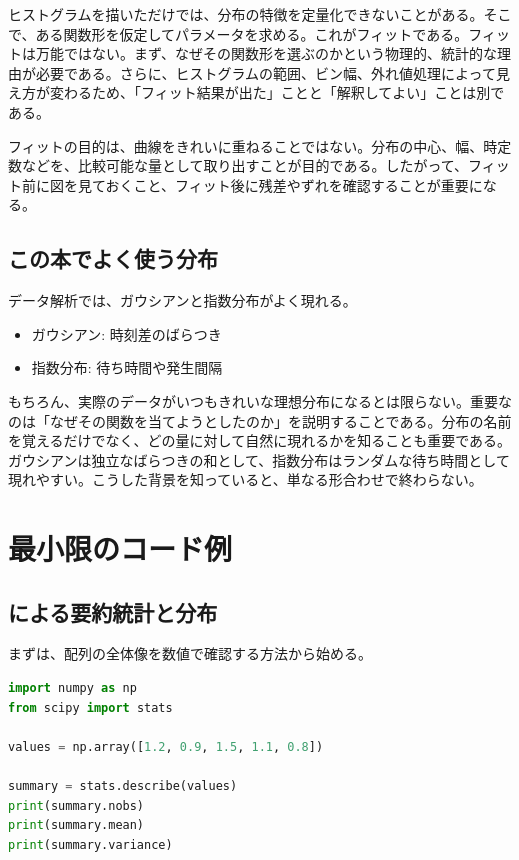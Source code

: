 ヒストグラムを描いただけでは、分布の特徴を定量化できないことがある。そこで、ある関数形を仮定してパラメータを求める。これがフィットである。フィットは万能ではない。まず、なぜその関数形を選ぶのかという物理的、統計的な理由が必要である。さらに、ヒストグラムの範囲、ビン幅、外れ値処理によって見え方が変わるため、「フィット結果が出た」ことと「解釈してよい」ことは別である。

フィットの目的は、曲線をきれいに重ねることではない。分布の中心、幅、時定数などを、比較可能な量として取り出すことが目的である。したがって、フィット前に図を見ておくこと、フィット後に残差やずれを確認することが重要になる。

\subsection{この本でよく使う分布}

データ解析では、ガウシアンと指数分布がよく現れる。

\begin{itemize}
\item ガウシアン: 時刻差のばらつき
\item 指数分布: 待ち時間や発生間隔
\end{itemize}

もちろん、実際のデータがいつもきれいな理想分布になるとは限らない。重要なのは「なぜその関数を当てようとしたのか」を説明することである。分布の名前を覚えるだけでなく、どの量に対して自然に現れるかを知ることも重要である。ガウシアンは独立なばらつきの和として、指数分布はランダムな待ち時間として現れやすい。こうした背景を知っていると、単なる形合わせで終わらない。

\section{最小限のコード例}

\subsection{ による要約統計と分布}

まずは、配列の全体像を数値で確認する方法から始める。

\begin{lstlisting}[language=Python]
import numpy as np
from scipy import stats

values = np.array([1.2, 0.9, 1.5, 1.1, 0.8])

summary = stats.describe(values)
print(summary.nobs)
print(summary.mean)
print(summary.variance)
\end{lstlisting}

